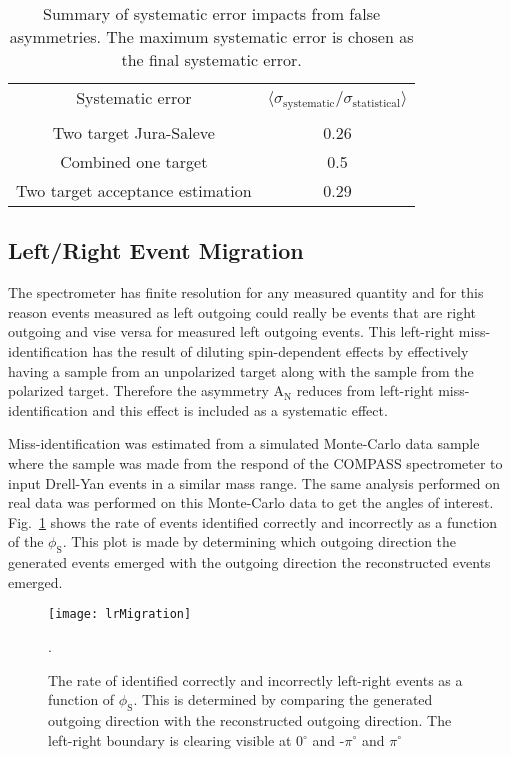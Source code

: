 \begin{table}[h!t]
  \centering
  \begin{tabular}{|c|c|}
    \hline Systematic error& \multirow{2}{9em}{$\langle
      \sigma_{\mathrm{systematic}}/\sigma_{\mathrm{statistical}}
      \rangle$}\\ & \\ \hline
    
    Two target Jura-Saleve& 0.26\\ \hline

    Combined one target& 0.5\\ \hline

    Two target acceptance estimation& 0.29\\ \hline
    
  \end{tabular}
  \caption{Summary of systematic error impacts from false asymmetries.  The
    maximum systematic error is chosen as the final systematic error.}
  \label{tab::faSys}
\end{table}


\subsection{Left/Right Event Migration}
The spectrometer has finite resolution for any measured quantity and for this
reason events measured as left outgoing could really be events that are right
outgoing and vise versa for measured left outgoing events.  This left-right
miss-identification has the result of diluting spin-dependent effects by
effectively having a sample from an unpolarized target along with the sample
from the polarized target.  Therefore the asymmetry A$_{\mathrm{N}}$ reduces
from left-right miss-identification and this effect is included as a systematic
effect. \par

Miss-identification was estimated from a simulated Monte-Carlo data sample where
the sample was made from the respond of the COMPASS spectrometer to input
Drell-Yan events in a similar mass range.  The same analysis performed on real
data was performed on this Monte-Carlo data to get the angles of interest.
Fig.~\ref{fig::lrMigration} shows the rate of events identified correctly and
incorrectly as a function of the $\phi_{\mathrm{S}}$.  This plot is made by
determining which outgoing direction the generated events emerged with the
outgoing direction the reconstructed events emerged.

\begin{figure}[h!t]
  \centering
  \texttt{[image: lrMigration]}
  \caption{The rate of identified correctly and incorrectly left-right events as
    a function of $\phi_{\mathrm{S}}$.  This is determined by comparing the
    generated outgoing direction with the reconstructed outgoing direction.  The
    left-right boundary is clearing visible at 0$^{\circ}$ and -$\pi^{\circ}$
    and $\pi^{\circ}$}.
  \label{fig::lrMigration}
\end{figure}

